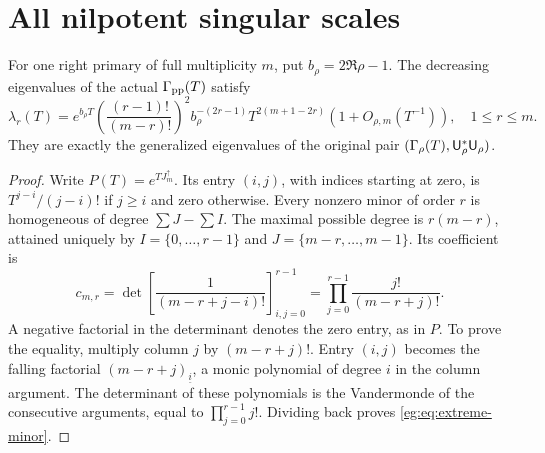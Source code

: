 \documentclass[11pt]{article}
\begin{document}
\section{All nilpotent singular scales}\label{eg:sec:nilpotent}
\begin{egtheorem}\label{eg:thm:scales}
For one right primary of full multiplicity $m$, put $b_\rho=2\Re\rho-1$.
The decreasing eigenvalues of the actual $\Gamma_{\rm pp}(T)$ satisfy
\[
 \lambda_r(T)=e^{b_\rho T}
 \left(\frac{(r-1)!}{(m-r)!}\right)^2 b_\rho^{-(2r-1)}
 T^{2(m+1-2r)}(1+O_{\rho,m}(T^{-1})),\quad 1\le r\le m.
 \tag{EG42}\label{eg:eq:all-scales}
\]
They are exactly the generalized eigenvalues of the original pair
$(\Gamma_\rho(T),\mathsf U_\rho^*\mathsf U_\rho)$.
\end{egtheorem}
\begin{proof}
Write $P(T)=e^{TJ_m^\uparrow}$. Its entry $(i,j)$, with indices
starting at zero, is $T^{j-i}/(j-i)!$ if $j\ge i$ and zero otherwise.
Every nonzero minor of order $r$ is homogeneous of degree
$\sum J-\sum I$. The maximal possible degree is $r(m-r)$,
attained uniquely by $I=\{0,\ldots,r-1\}$ and
$J=\{m-r,\ldots,m-1\}$. Its coefficient is
\[
 c_{m,r}=\det\left[\frac1{(m-r+j-i)!}\right]_{i,j=0}^{r-1}
                  =\prod_{j=0}^{r-1}\frac{j!}{(m-r+j)!}.
 \tag{EG43}\label{eg:eq:extreme-minor}
\]
A negative factorial in the determinant denotes the zero entry,
as in $P$. To prove the equality, multiply column $j$ by
$(m-r+j)!$. Entry $(i,j)$ becomes the falling factorial
$(m-r+j)_{\underline i}$, a monic polynomial of degree $i$ in
the column argument. The determinant of these polynomials is the
Vandermonde of the consecutive arguments, equal to
$\prod_{j=0}^{r-1}j!$. Dividing back proves \eqref{eg:eq:extreme-minor}.


\end{proof}
\end{document}
